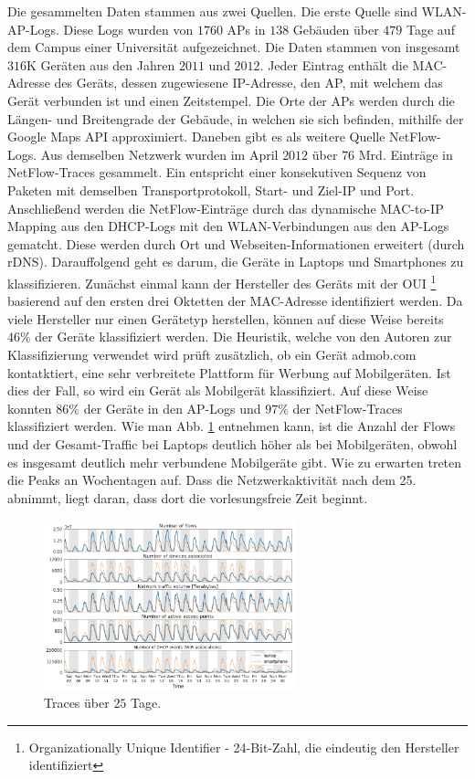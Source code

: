 \documentclass[12pt, a4paper]{article}
\begin{document}
Die gesammelten Daten stammen aus zwei Quellen. Die erste Quelle sind WLAN-AP-Logs. Diese Logs wurden von $1760$ APs in $138$ Gebäuden über $479$ Tage auf dem
Campus einer Universität aufgezeichnet. Die Daten stammen von insgesamt $316$\textsc{K} Geräten aus den Jahren $2011$ und $2012$.
Jeder Eintrag enthält die MAC-Adresse des Geräts, dessen zugewiesene IP-Adresse, den AP, mit welchem das Gerät verbunden ist
und einen Zeitstempel.
Die Orte der APs werden durch die Längen- und Breitengrade der Gebäude, in welchen sie sich befinden, mithilfe der Google Maps API
approximiert. Daneben gibt es als weitere Quelle NetFlow-Logs. Aus demselben Netzwerk wurden im April $2012$ über $76$ Mrd.
Einträge in NetFlow-Traces gesammelt. Ein  entspricht einer konsekutiven Sequenz von Paketen mit demselben
Transportprotokoll, Start- und Ziel-IP und Port. \cite{Alipour2018}
Anschließend werden die NetFlow-Einträge durch das dynamische MAC-to-IP Mapping aus den DHCP-Logs mit den WLAN-Verbindungen
aus den AP-Logs gematcht. Diese werden durch Ort und Webseiten-Informationen erweitert (durch rDNS).
\newline\newline
Darauffolgend geht es darum, die Geräte in Laptops und Smartphones zu klassifizieren.
Zunächst einmal kann der Hersteller des Geräts mit der OUI \footnote{Organizationally Unique Identifier - 24-Bit-Zahl, die eindeutig den Hersteller identifiziert} basierend auf den
ersten drei Oktetten der MAC-Adresse identifiziert werden. Da viele Hersteller nur einen Gerätetyp herstellen, können auf diese Weise bereits
$46 \%$ der Geräte klassifiziert werden. Die Heuristik, welche von den Autoren zur Klassifizierung verwendet wird
prüft zusätzlich, ob ein Gerät admob.com kontatktiert, eine sehr verbreitete Plattform für Werbung auf Mobilgeräten.
Ist dies der Fall, so wird ein Gerät als Mobilgerät klassifiziert. Auf diese Weise konnten $86 \%$ der Geräte in den AP-Logs
und $97 \%$ der NetFlow-Traces klassifiziert werden. Wie man Abb. \ref{fig:traces} entnehmen kann, ist die Anzahl der Flows und der
Gesamt-Traffic bei Laptops deutlich höher als bei Mobilgeräten, obwohl es insgesamt deutlich mehr verbundene Mobilgeräte gibt.
Wie zu erwarten treten die Peaks an Wochentagen auf. Dass die Netzwerkaktivität nach dem 25. abnimmt, liegt daran, dass dort
die vorlesungsfreie Zeit beginnt.

\begin{figure}[H]
    \centering
    \includegraphics[width=0.65\textwidth]{img/traces.png}
    \caption{Traces über $25$ Tage. \cite{Alipour2018}}
    \label{fig:traces}
\end{figure}
\end{document}

